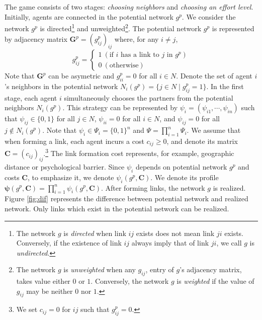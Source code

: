 \documentclass[12pt]{article}
\theoremstyle{definition}
\newcommand{\bm}[1]{\boldsymbol{#1}}
\begin{document}
The game consists of two stages: {\it{choosing neighbors}} and {\it{choosing an effort level}}.
Initially, agents are connected in the potential network $g^p$.
We consider the network $g^p$ is directed\footnote{The network $g$ is {\it{directed}} when link $ij$ exists does not mean link $ji$ exists. Conversely, if the existence of link $ij$ always imply that of link $ji$, we call $g$ is {\it{undirected}}.} and unweighted\footnote{The network $g$ is {\it{unweighted}} when any $g_{ij}$, entry of $g$'s adjacency matrix, takes value either $0$ or $1$. Conversely, the network $g$ is {\it{weighted}} if the value of $g_{ij}$ may be neither $0$ nor $1$.}.
The potential network $g^p$ is represented by adjacency matrix $\bm{G}^p = {(g_{ij}^p)}_{ij}$ where, for any $i \neq j$,
\[ g_{ij}^p =
	\begin{cases}
		1 \  (\text{if $i$ has a link to $j$ in $g^p $}) \\
		0 \  (\text{otherwise})
	\end{cases} \]
Note that $\bm{G}^p$ can be asymetric and $g_{ii}^p = 0$ for all $i \in N$.
Denote the set of agent $i$'s neighbors in the potential network $N_i(g^p) = \{ j \in N \mid g_{ij}^p = 1 \}$.
In the first stage, each agent $i$ simultaneously chooses the partners from the potential neighbors $N_i(g^p)$.
This strategy can be represented by $\psi_i = (\psi_{i1}, \cdots, \psi_{in})$ such that $\psi_{ij} \in \{0, 1\}$ for all $j \in N$, $\psi_{ii}=0$ for all $i \in N$, and $\psi_{ij} = 0$ for all $j \notin N_i(g^p)$.
Note that $\psi_i \in \Psi_i = \{0, 1\}^{n}$ and $\Psi = \prod_{i=1}^n \Psi_i$.
We assume that when forming a link, each agent incurs a cost $c_{ij} \ge 0$, and denote its matrix $\bm{C} = {(c_{ij})}_{ij}$.\footnote{We set $c_{ij} = 0$ for $ij$ such that $g_{ij}^p = 0$.}
The link formation cost represents, for example, geographic distance or psychological barrier.
Since $\psi_i$ depends on potential network $g^p$ and costs $\bm{C}$, to emphasize it, we denote $\psi_i(g^p, \bm{C})$.
We denote its profile $\bm{\psi}(g^p, \bm{C}) = \prod_{i=1}^n \psi_i(g^p, \bm{C})$.
After forming links, the network $g$ is realized.
Figure \ref{fig:dif} represents the difference between potential network and realized network.
Only links which exist in the potential network can be realized.
\end{document}

